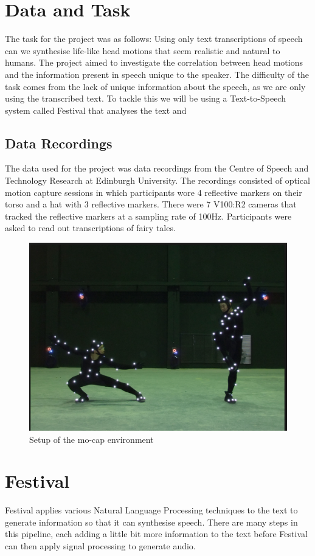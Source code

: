 \documentclass[bsc,frontabs,twoside,singlespacing,parskip]{infthesis}
\begin{document}
\section{Data and Task}

The task for the project was as follows: Using only text transcriptions of speech can we synthesise life-like head motions that seem realistic and natural to humans. The project aimed to investigate the correlation between head motions and the information present in speech unique to the speaker. The difficulty of the task comes from the lack of unique information about the speech, as we are only using the transcribed text. To tackle this we will be using a Text-to-Speech system called Festival that analyses the text and 

\subsection{Data Recordings}

The data used for the project was data recordings from the Centre of Speech and Technology Research at Edinburgh University. The recordings consisted of optical motion capture sessions in which participants wore 4 reflective markers on their torso and a hat with 3 reflective markers. There were 7 V100:R2 cameras that tracked the reflective markers at a sampling rate of 100Hz. Participants were asked to read out transcriptions of fairy tales.

\begin{figure}[h!]
	\centering
	\includegraphics[width=.5\textwidth]{mocap.png}
	\caption{Setup of the mo-cap environment}
\end{figure}

\section{Festival}

Festival applies various Natural Language Processing techniques to the text to generate information  so that it can synthesise speech.  There are many steps in this pipeline, each adding a little bit more information to the text before Festival can then apply signal processing to generate audio. 
\end{document}

